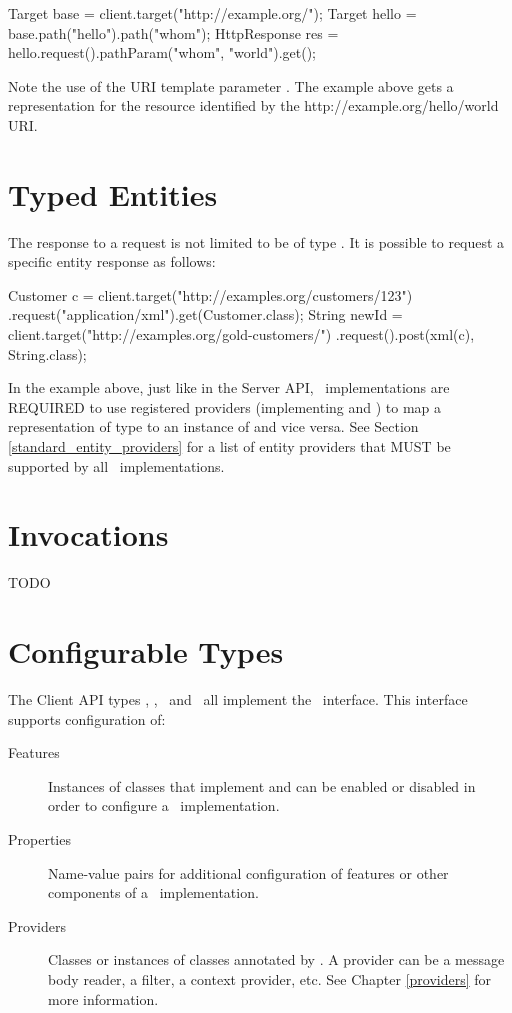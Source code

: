 \begin{listing}{1}
Target base = client.target("http://example.org/");
Target hello = base.path("hello").path("{whom}");   
HttpResponse res = hello.request().pathParam("whom", "world").get();
\end{listing}

Note the use of the URI template parameter . The example above gets a representation for the resource identified by the http://example.org/hello/world URI.

\section{Typed Entities}

The response to a request is not limited to be of type \HttpResponse. It is possible to request a specific entity response as follows:

\begin{listing}{1}
Customer c = client.target("http://examples.org/customers/123")
    .request("application/xml").get(Customer.class);
String newId = client.target("http://examples.org/gold-customers/")
    .request().post(xml(c), String.class);
\end{listing}

In the example above, just like in the Server API, \jaxrs\ implementations are REQUIRED to use registered providers (implementing  and ) to map a representation of type  to an instance of  and vice versa. See Section \ref{standard_entity_providers} for a list of entity providers that MUST be supported by all \jaxrs\ implementations.

\section{Invocations}
\label{invocations}

TODO

\section{Configurable Types}
\label{configurable_types}

The Client API types \Client, \Invocation, \InvocationBuilder\ and \Target\ all implement the \Configurable\ interface. This interface supports configuration of:

\begin{description}
\item [Features] Instances of classes that implement  and can be enabled or disabled in order to configure a \jaxrs\ implementation.
\item [Properties] Name-value pairs for additional configuration of features or other components of a \jaxrs\ implementation.
\item [Providers] Classes or instances of classes annotated by \Provider. A provider can be a message body reader, a filter, a context provider, etc. See Chapter \ref{providers} for more information.
\end{description}

